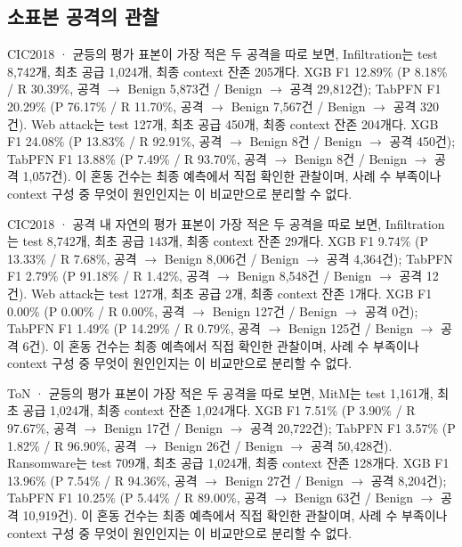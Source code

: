 \subsection{소표본 공격의 관찰}
CIC2018 · 균등의 평가 표본이 가장 적은 두 공격을 따로 보면, Infiltration는 test 8,742개, 최초 공급 1,024개, 최종 context 잔존 205개다. XGB F1 12.89\% (P 8.18\% /\allowbreak{} R 30.39\%, 공격 \ensuremath{\rightarrow} Benign 5,873건 /\allowbreak{} Benign \ensuremath{\rightarrow} 공격 29,812건); TabPFN F1 20.29\% (P 76.17\% /\allowbreak{} R 11.70\%, 공격 \ensuremath{\rightarrow} Benign 7,567건 /\allowbreak{} Benign \ensuremath{\rightarrow} 공격 320건). Web attack는 test 127개, 최초 공급 450개, 최종 context 잔존 204개다. XGB F1 24.08\% (P 13.83\% /\allowbreak{} R 92.91\%, 공격 \ensuremath{\rightarrow} Benign 8건 /\allowbreak{} Benign \ensuremath{\rightarrow} 공격 450건); TabPFN F1 13.88\% (P 7.49\% /\allowbreak{} R 93.70\%, 공격 \ensuremath{\rightarrow} Benign 8건 /\allowbreak{} Benign \ensuremath{\rightarrow} 공격 1,057건). 이 혼동 건수는 최종 예측에서 직접 확인한 관찰이며, 사례 수 부족이나 context 구성 중 무엇이 원인인지는 이 비교만으로 분리할 수 없다.

CIC2018 · 공격 내 자연의 평가 표본이 가장 적은 두 공격을 따로 보면, Infiltration는 test 8,742개, 최초 공급 143개, 최종 context 잔존 29개다. XGB F1 9.74\% (P 13.33\% /\allowbreak{} R 7.68\%, 공격 \ensuremath{\rightarrow} Benign 8,006건 /\allowbreak{} Benign \ensuremath{\rightarrow} 공격 4,364건); TabPFN F1 2.79\% (P 91.18\% /\allowbreak{} R 1.42\%, 공격 \ensuremath{\rightarrow} Benign 8,548건 /\allowbreak{} Benign \ensuremath{\rightarrow} 공격 12건). Web attack는 test 127개, 최초 공급 2개, 최종 context 잔존 1개다. XGB F1 0.00\% (P 0.00\% /\allowbreak{} R 0.00\%, 공격 \ensuremath{\rightarrow} Benign 127건 /\allowbreak{} Benign \ensuremath{\rightarrow} 공격 0건); TabPFN F1 1.49\% (P 14.29\% /\allowbreak{} R 0.79\%, 공격 \ensuremath{\rightarrow} Benign 125건 /\allowbreak{} Benign \ensuremath{\rightarrow} 공격 6건). 이 혼동 건수는 최종 예측에서 직접 확인한 관찰이며, 사례 수 부족이나 context 구성 중 무엇이 원인인지는 이 비교만으로 분리할 수 없다.

ToN · 균등의 평가 표본이 가장 적은 두 공격을 따로 보면, MitM는 test 1,161개, 최초 공급 1,024개, 최종 context 잔존 1,024개다. XGB F1 7.51\% (P 3.90\% /\allowbreak{} R 97.67\%, 공격 \ensuremath{\rightarrow} Benign 17건 /\allowbreak{} Benign \ensuremath{\rightarrow} 공격 20,722건); TabPFN F1 3.57\% (P 1.82\% /\allowbreak{} R 96.90\%, 공격 \ensuremath{\rightarrow} Benign 26건 /\allowbreak{} Benign \ensuremath{\rightarrow} 공격 50,428건). Ransomware는 test 709개, 최초 공급 1,024개, 최종 context 잔존 128개다. XGB F1 13.96\% (P 7.54\% /\allowbreak{} R 94.36\%, 공격 \ensuremath{\rightarrow} Benign 27건 /\allowbreak{} Benign \ensuremath{\rightarrow} 공격 8,204건); TabPFN F1 10.25\% (P 5.44\% /\allowbreak{} R 89.00\%, 공격 \ensuremath{\rightarrow} Benign 63건 /\allowbreak{} Benign \ensuremath{\rightarrow} 공격 10,919건). 이 혼동 건수는 최종 예측에서 직접 확인한 관찰이며, 사례 수 부족이나 context 구성 중 무엇이 원인인지는 이 비교만으로 분리할 수 없다.

